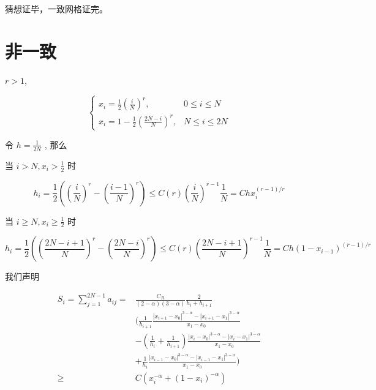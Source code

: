 \documentclass{ctexart}
\begin{document}
猜想证毕，一致网格证完。


\section{非一致}

\(r > 1\), 

\begin{equation}
    \begin{cases}
        x_i = \frac{1}{2} \left(\frac{i}{N}\right)^r   , & 0 \le i \le N  \\
        x_i = 1 - \frac{1}{2} \left(\frac{2N-i}{N}\right)^r, &  N \le i \le 2N
    \end{cases}
\end{equation}

令 \(h=\frac{1}{2N}\) , 那么

当 \(i > N, x_i > \frac{1}{2}\) 时

\begin{equation}
    h_i = \frac{1}{2} \left(\left(\frac{i}{N}\right)^r - \left(\frac{i-1}{N}\right)^r\right) 
        \le C(r) \left(\frac{i}{N}\right)^{r-1} \frac{1}{N} = C h x_i^{(r-1)/r} 
\end{equation}

当 \(i \ge N, x_i \ge \frac{1}{2}\) 时

\begin{equation}
    h_i = \frac{1}{2} \left(\left(\frac{2N-i+1}{N}\right)^r - \left(\frac{2N-i}{N}\right)^r\right) 
        \le C(r) \left(\frac{2N-i+1}{N}\right)^{r-1} \frac{1}{N} = C h (1-x_{i-1})^{(r-1)/r} 
\end{equation}


我们声明

\begin{equation}
    \begin{aligned}
        S_i =\sum_{j=1}^{2N-1}a_{ij} = & \frac{C_R}{(2-\alpha)(3-\alpha)} \frac{2}{h_i + h_{i+1}} \\
        & ( \frac{1}{h_{i+1}} \frac{|x_{i+1}-x_0|^{3-\alpha} - |x_{i+1}-x_1|^{3-\alpha}}{x_1 - x_0} \\ 
        &- (\frac{1}{h_{i}}+\frac{1}{h_{i+1}})\frac{|x_{i}-x_0|^{3-\alpha} - |x_{i}-x_1|^{3-\alpha}}{x_1 - x_0}     \\ 
        &+  \frac{1}{h_{i}} \frac{|x_{i-1}-x_0|^{3-\alpha} - |x_{i-1}-x_1|^{3-\alpha}}{x_1 - x_0} )\\
        \ge & C (x_i^{-\alpha} + (1-x_i)^{-\alpha})
    \end{aligned}
\end{equation}
\end{document}
